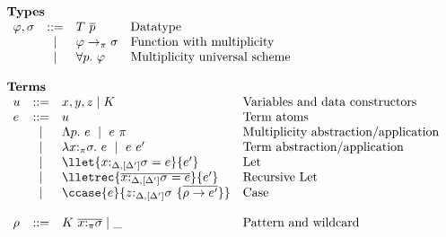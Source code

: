 
\begin{figure}[h]
\begin{framed}
\[
\begin{array}{l}
%
\textbf{Types} \\
\begin{array}{lcll}
    \varphi,\sigma  & ::=  & T~\overline{p}         & \textrm{Datatype} \\
                    & \mid & \varphi \to_\pi \sigma & \textrm{Function with multiplicity}\\
                    & \mid & \forall p.~\varphi     & \textrm{Multiplicity universal scheme}\\
\end{array}\\\\
%
\textbf{Terms}\\
\begin{array}{lcll}
    u                & ::=  & x,y,z \mid K                                                     & \textrm{Variables and data constructors}\\
    e                & ::=  & u                                                                & \textrm{Term atoms}\\
                     & \mid & \Lambda p.~e~\mid~e~\pi                                          & \textrm{Multiplicity abstraction/application}\\
                     & \mid & \lambda x{:}_\pi\sigma.~e~\mid~e~e'                           & \textrm{Term abstraction/application}\\
                     & \mid & \llet{x{:}_{\Delta,[\Delta']}\sigma = e}{e'}                              & \textrm{Let} \\
                     & \mid & \lletrec{\overline{x{:}_{\Delta,[\Delta']}\sigma = e}}{e'}             & \textrm{Recursive Let} \\
                     & \mid &
                     \ccase{e}{z{:}_{\Delta,[\Delta']}\sigma~\{\overline{\rho\to e'}\}}   & \textrm{Case} \\
                     &      &                                                                  & \\
    \rho             & ::=  & K~\overline{x{:}_\pi\sigma} \mid \_                              & \textrm{Pattern and wildcard} \\

\end{array}
\end{array}\]
\end{framed}
\end{figure}
